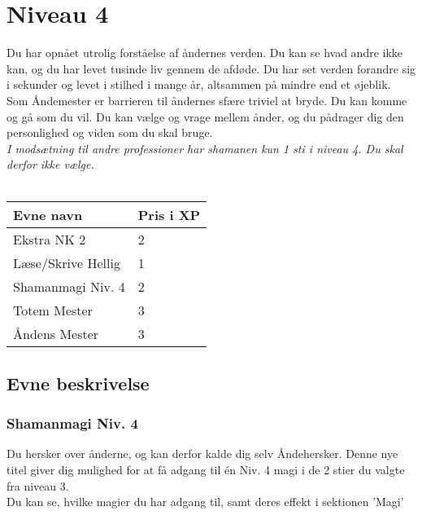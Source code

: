 \chapter*{Niveau 4}
Du har opnået utrolig forståelse af åndernes verden. Du kan se hvad andre ikke kan, og du har levet tusinde liv gennem de afdøde. Du har set verden forandre sig i sekunder og levet i stilhed i mange år, altsammen på mindre end et øjeblik.\\
Som Åndemester er barrieren til åndernes sfære triviel at bryde. Du kan komme og gå som du vil. Du kan vælge og vrage mellem ånder, og du pådrager dig den personlighed og viden som du skal bruge.\\ 


\emph{I modsætning til andre professioner har shamanen kun 1 sti i niveau 4. Du skal derfor ikke vælge.}\\\\

\begin{table}[H]
    \centering
    \begin{tabular}{|p{}|p{}|}
    \rowcolor{cerulean!80}\hline
        Evne navn & Pris i XP \\\hline
        Ekstra NK 2 & 2 \\\hline
        Læse/Skrive Hellig& 1 \\\hline
        Shamanmagi Niv. 4 & 2 \\\hline
        Totem Mester & 3 \\\hline
        Åndens Mester& 3 \\\hline
    \end{tabular}
\end{table}


\section*{Evne beskrivelse}






\subsection*{Shamanmagi Niv. 4} 
Du hersker over ånderne, og kan derfor kalde dig selv Åndehersker. Denne nye titel giver dig mulighed for at få adgang til én Niv. 4 magi i de 2 stier du valgte fra niveau 3.\\
Du kan se, hvilke magier du har adgang til, samt deres effekt i sektionen 'Magi'\\

